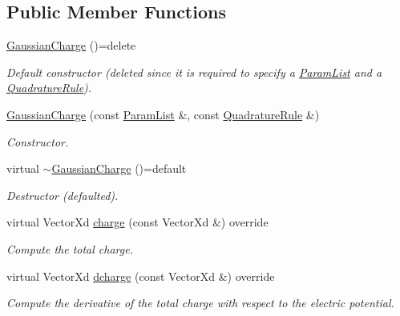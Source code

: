 \subsection*{Public Member Functions}
\begin{DoxyCompactItemize}
\item 
\hypertarget{classGaussianCharge_a860db9bf8bccf98756f1f6bd60de5463}{\hyperlink{classGaussianCharge_a860db9bf8bccf98756f1f6bd60de5463}{Gaussian\-Charge} ()=delete}\label{classGaussianCharge_a860db9bf8bccf98756f1f6bd60de5463}

\begin{DoxyCompactList}\small\item\em Default constructor (deleted since it is required to specify a \hyperlink{classParamList}{Param\-List} and a \hyperlink{classQuadratureRule}{Quadrature\-Rule}). \end{DoxyCompactList}\item 
\hyperlink{classGaussianCharge_a3e5ff9c43a3deb7861ea10435de4bb55}{Gaussian\-Charge} (const \hyperlink{classParamList}{Param\-List} \&, const \hyperlink{classQuadratureRule}{Quadrature\-Rule} \&)
\begin{DoxyCompactList}\small\item\em Constructor. \end{DoxyCompactList}\item 
\hypertarget{classGaussianCharge_ab64872dfef0abc7d116d65373496ac33}{virtual \hyperlink{classGaussianCharge_ab64872dfef0abc7d116d65373496ac33}{$\sim$\-Gaussian\-Charge} ()=default}\label{classGaussianCharge_ab64872dfef0abc7d116d65373496ac33}

\begin{DoxyCompactList}\small\item\em Destructor (defaulted). \end{DoxyCompactList}\item 
virtual Vector\-Xd \hyperlink{classGaussianCharge_ace13e6c8f0e0eaac0b3e397d406bed1a}{charge} (const Vector\-Xd \&) override
\begin{DoxyCompactList}\small\item\em Compute the total charge. \end{DoxyCompactList}\item 
virtual Vector\-Xd \hyperlink{classGaussianCharge_a93bfdcacb3bd72aa196771816ee24ab4}{dcharge} (const Vector\-Xd \&) override
\begin{DoxyCompactList}\small\item\em Compute the derivative of the total charge with respect to the electric potential. \end{DoxyCompactList}\end{DoxyCompactItemize}
